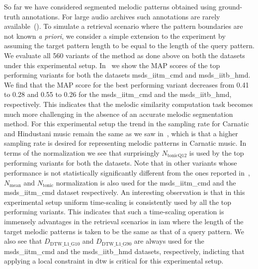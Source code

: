 So far we have considered segmented melodic patterns obtained using ground-truth annotations. For large audio archives such annotations are rarely available~(). To simulate a retrieval scenario where the pattern boundaries are not known \textit{a priori}, we consider a simple extension to the experiment by assuming the target pattern length to be equal to the length of the query pattern. We evaluate all 560 variants of the method as done above on both the datasets under this experimental setup. In~ we show the MAP scores of the top performing variants for both the datasets \acrshort{msds_iitm_cmd} and \acrshort{msds_iitb_hmd}. We find that the MAP score for the best performing variant decreases from 0.41 to 0.28 and 0.55 to 0.26 for the \acrshort{msds_iitm_cmd} and the \acrshort{msds_iitb_hmd}, respectively. This indicates that the melodic similarity computation task becomes much more challenging in the absence of an accurate melodic segmentation method. For this experimental setup the trend in the sampling rate for Carnatic and Hindustani music remain the same as we saw in~, which is that a higher sampling rate is desired for representing melodic patterns in Carnatic music. In terms of the normalization we see that surprisingly $N_{\mathrm{tonicQ12}}$ is used by the top performing variants for both the datasets. Note that in other variants whose performance is not statistically significantly different from the ones reported in~, $N_{\mathrm{mean}}$ and $N_{\mathrm{tonic}}$ normalization is also used for the \acrshort{msds_iitm_cmd} and the \acrshort{msds_iitm_cmd} dataset respectively. An interesting observation is that in this experimental setup uniform time-scaling is consistently used by all the top performing variants. This indicates that such a time-scaling operation is immensely advantages in the retrieval scenarios in \gls{iam} where the length of the target melodic patterns is taken to be the same as that of a query pattern. We also see that $D_{\mathrm{DTW\_L1\_G10}}$ and $D_{\mathrm{DTW\_L1\_G90}}$ are always used for the \acrshort{msds_iitm_cmd} and the \acrshort{msds_iitb_hmd} datasets, respectively, indicting that applying a local constraint in \gls{dtw} is critical for this experimental setup.



